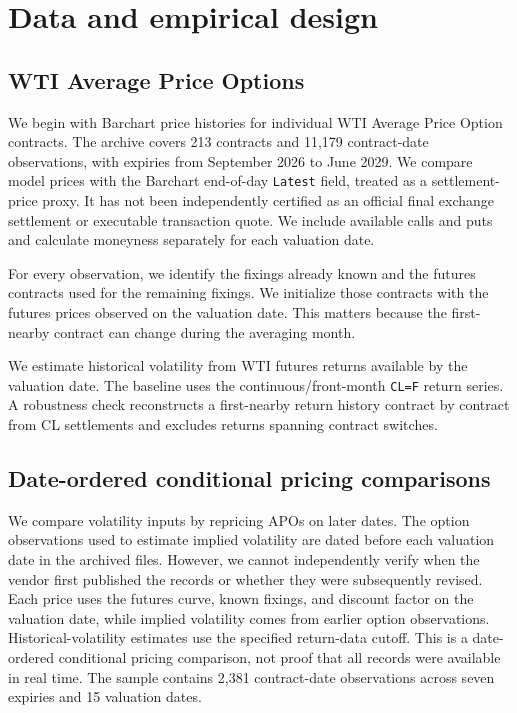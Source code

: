 \section{Data and empirical design}\label{sec:short_design}

\subsection{WTI Average Price Options}

We begin with Barchart price histories for individual WTI Average Price Option contracts. The archive covers 213 contracts and 11,179 contract-date observations, with expiries from September 2026 to June 2029. We compare model prices with the Barchart end-of-day \texttt{Latest} field, treated as a settlement-price proxy. It has not been independently certified as an official final exchange settlement or executable transaction quote. We include available calls and puts and calculate moneyness separately for each valuation date.

For every observation, we identify the fixings already known and the futures contracts used for the remaining fixings. We initialize those contracts with the futures prices observed on the valuation date. This matters because the first-nearby contract can change during the averaging month.

We estimate historical volatility from WTI futures returns available by the valuation date. The baseline uses the continuous/front-month \texttt{CL=F} return series. A robustness check reconstructs a first-nearby return history contract by contract from CL settlements and excludes returns spanning contract switches.

\subsection{Date-ordered conditional pricing comparisons}

We compare volatility inputs by repricing APOs on later dates.
The option observations used to estimate implied volatility are
dated before each valuation date in the archived files. However,
we cannot independently verify when the vendor first published
the records or whether they were subsequently revised. Each price
uses the futures curve, known fixings, and discount factor on the
valuation date, while implied volatility comes from earlier
option observations. Historical-volatility estimates use the
specified return-data cutoff. This is a date-ordered conditional
pricing comparison, not proof that all records were available
in real time. The sample contains 2,381 contract-date
observations across seven expiries and 15 valuation dates.

